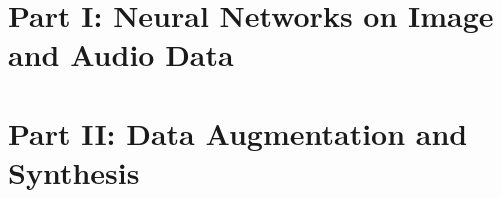 
\newpage

\section{Part I: Neural Networks on Image and Audio Data}

\newpage


\newpage


\newpage

\section{Part II: Data Augmentation and Synthesis}

\newpage


\newpage


\newpage
